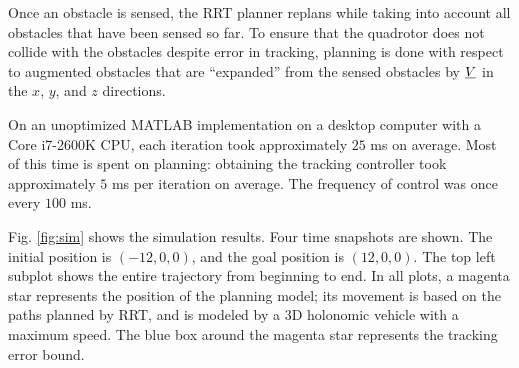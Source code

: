 Once an obstacle is sensed, the RRT planner replans while taking into account all obstacles that have been sensed so far. To ensure that the quadrotor does not collide with the obstacles despite error in tracking, planning is done with respect to augmented obstacles that are ``expanded'' from the sensed obstacles by $\underline{V}$ in the $x$, $y$, and $z$ directions.

On an unoptimized MATLAB implementation on a desktop computer with a Core i7-2600K CPU, each iteration took approximately $25$ ms on average. Most of this time is spent on planning: obtaining the tracking controller took approximately $5$ ms per iteration on average. The frequency of control was once every $100$ ms.

Fig. \ref{fig:sim} shows the simulation results. Four time snapshots are shown. The initial position is $(-12, 0, 0)$, and the goal position is $(12, 0, 0)$. The top left subplot shows the entire trajectory from beginning to end. In all plots, a magenta star represents the position of the planning model; its movement is based on the paths planned by RRT, and is modeled by a 3D holonomic vehicle with a maximum speed. The blue box around the magenta star represents the tracking error bound.
